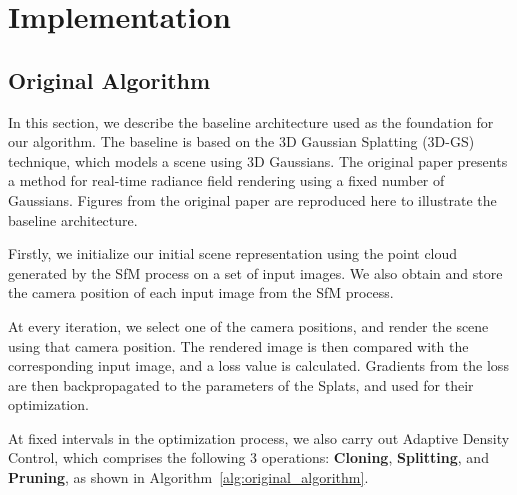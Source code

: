 \documentclass[11pt]{report}
\begin{document}
\chapter{Implementation}

\section{Original Algorithm}



In this section, we describe the baseline architecture used as the foundation for our algorithm. The baseline is based on the 3D Gaussian Splatting (3D-GS) technique, which models a scene using 3D Gaussians. The original paper presents a method for real-time radiance field rendering using a fixed number of Gaussians. Figures from the original paper are reproduced here to illustrate the baseline architecture.

Firstly, we initialize our initial scene representation using the point cloud generated by the SfM process on a set of input images. We also obtain and store the camera position of each input image from the SfM process.

At every iteration, we select one of the camera positions, and render the scene using that camera position. The rendered image is then compared with the corresponding input image, and a loss value is calculated. Gradients from the loss are then backpropagated to the parameters of the Splats, and used for their optimization.

At fixed intervals in the optimization process, we also carry out Adaptive Density Control, which comprises the following 3 operations: \textbf{Cloning}, \textbf{Splitting}, and \textbf{Pruning}, as shown in Algorithm~\ref{alg:original_algorithm}.
\end{document}
